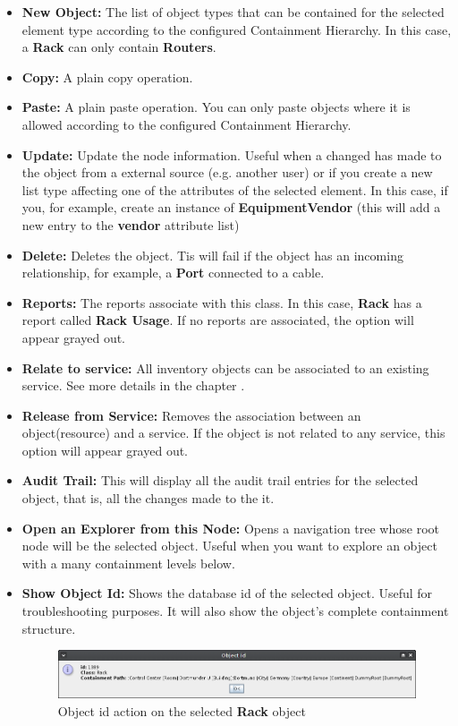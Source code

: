 \documentclass[a4paper]{article}
\begin{document}
	\begin{itemize}
		\item \textbf{New Object:} The list of object types that can be contained for the selected element type according to the configured Containment Hierarchy. In this case, a \textbf{Rack} can only contain \textbf{Routers}.
		\item \textbf{Copy:} A plain copy operation.
		\item \textbf{Paste:} A plain paste operation. You can only paste objects where it is allowed according to the configured Containment Hierarchy.
		\item \textbf{Update:} Update the node information. Useful when a changed has made to the object from a external source (e.g. another user) or if you create a new list type affecting one of the attributes of the selected element. In this case, if you, for example, create an instance of \textbf{EquipmentVendor} (this will add a new entry to the \textbf{vendor} attribute list)
		\item \textbf{Delete:} Deletes the object. Tis will fail if the object has an incoming relationship, for example, a \textbf{Port} connected to a cable.
		\item \textbf{Reports:} The reports associate with this class. In this case, \textbf{Rack} has a report called \textbf{Rack Usage}. If no reports are associated, the option will appear grayed out.
		\item \textbf{Relate to service:} All inventory objects can be associated to an existing service. See more details in the chapter .
		\item \textbf{Release from Service:} Removes the association between an object(resource) and a service. If the object is not related to any service, this option will appear grayed out.
		\item \textbf{Audit Trail:} This will display all the audit trail entries for the selected object, that is, all the changes made to the it.
		\item \textbf{Open an Explorer from this Node:} Opens a navigation tree whose root node will be the selected object. Useful when you want to explore an object with a many containment levels below.
		\item \textbf{Show Object Id:} Shows the database id of the selected object. Useful for troubleshooting purposes. It will also show the object's complete containment structure.
			\begin{figure}[h!]
				\centering
				\includegraphics[width=\linewidth]{img/action_show_object_id.png}
				\caption{Object id action on the selected \textbf{Rack} object}
				\label{fig:action_show_object_id}
			\end{figure}
	\end{itemize}
\end{document}
